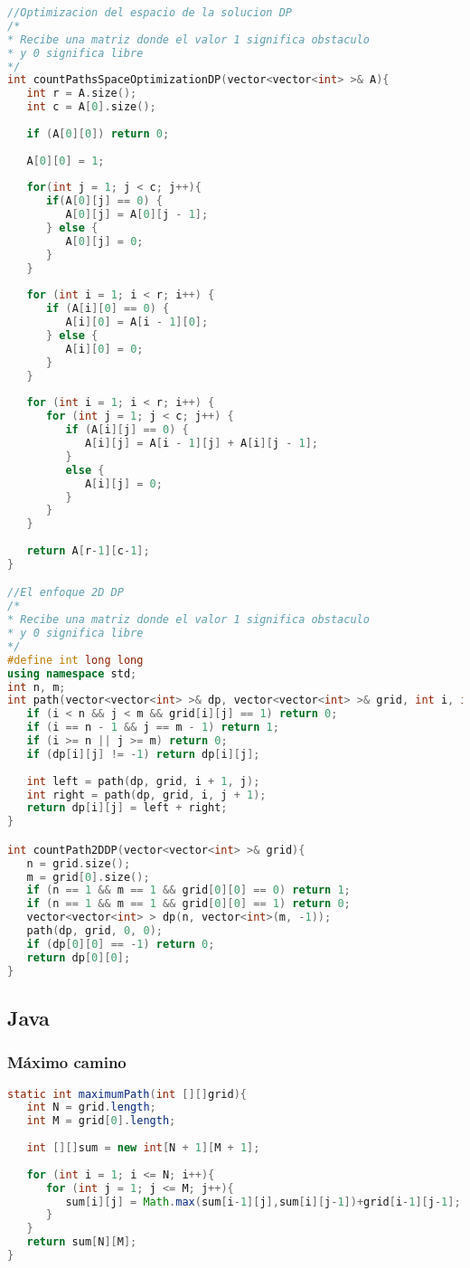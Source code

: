 \begin{lstlisting}[language=C++]
//Optimizacion del espacio de la solucion DP
/*
* Recibe una matriz donde el valor 1 significa obstaculo
* y 0 significa libre
*/
int countPathsSpaceOptimizationDP(vector<vector<int> >& A){
   int r = A.size();
   int c = A[0].size();
   
   if (A[0][0]) return 0;
	
   A[0][0] = 1;
   
   for(int j = 1; j < c; j++){
      if(A[0][j] == 0) {
         A[0][j] = A[0][j - 1];
      } else {
         A[0][j] = 0;
      }
   }
   
   for (int i = 1; i < r; i++) {
      if (A[i][0] == 0) {
         A[i][0] = A[i - 1][0];
      } else {
         A[i][0] = 0;
      }
   }
	
   for (int i = 1; i < r; i++) {
      for (int j = 1; j < c; j++) {
         if (A[i][j] == 0) {
            A[i][j] = A[i - 1][j] + A[i][j - 1];
         }
         else {
            A[i][j] = 0;
         }
      }
   }
   
   return A[r-1][c-1];
}

//El enfoque 2D DP
/*
* Recibe una matriz donde el valor 1 significa obstaculo
* y 0 significa libre
*/
#define int long long
using namespace std;
int n, m;
int path(vector<vector<int> >& dp, vector<vector<int> >& grid, int i, int j){
   if (i < n && j < m && grid[i][j] == 1) return 0;
   if (i == n - 1 && j == m - 1) return 1;
   if (i >= n || j >= m) return 0;
   if (dp[i][j] != -1) return dp[i][j];
   
   int left = path(dp, grid, i + 1, j);
   int right = path(dp, grid, i, j + 1);
   return dp[i][j] = left + right;
}

int countPath2DDP(vector<vector<int> >& grid){
   n = grid.size();
   m = grid[0].size();
   if (n == 1 && m == 1 && grid[0][0] == 0) return 1;
   if (n == 1 && m == 1 && grid[0][0] == 1) return 0;
   vector<vector<int> > dp(n, vector<int>(m, -1));
   path(dp, grid, 0, 0);
   if (dp[0][0] == -1) return 0;
   return dp[0][0];
}
\end{lstlisting}

\subsection{Java}
\subsubsection{Máximo camino}
\begin{lstlisting}[language=Java]
static int maximumPath(int [][]grid){
   int N = grid.length;
   int M = grid[0].length;
	
   int [][]sum = new int[N + 1][M + 1];
   
   for (int i = 1; i <= N; i++){
      for (int j = 1; j <= M; j++){
         sum[i][j] = Math.max(sum[i-1][j],sum[i][j-1])+grid[i-1][j-1];
      }
   }
   return sum[N][M];
}
\end{lstlisting}

